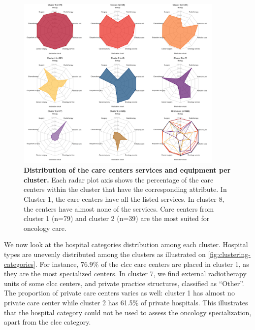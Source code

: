\begin{figure}[H]
    \includegraphics[width=0.9\textwidth]{images/camion/fig1_clusters_services.png}
    \centering
    \caption{ \textbf{Distribution of the care centers services and equipment
            per cluster.} Each radar plot axis shows the percentage of the care
        centers within the cluster that have the corresponding attribute. In
        Cluster 1, the care centers have all the listed services. In cluster 8,
        the centers have almost none of the services. Care centers from cluster
        1 (n=79) and cluster 2 (n=39) are the most suited for oncology care. }
    \label{fig:clustering-spider}
\end{figure}

We now look at the hospital categories distribution among each cluster. Hospital
types are unevenly distributed among the clusters as illustrated on
\cref{fig:clustering-categories}. For instance, 76.9\% of the \ac{clcc} care
centers are placed in cluster 1, as they are the most specialized centers. In
cluster 7, we find external radiotherapy units of some \ac{clcc} centers, and
private practice structures, classified as ``Other''. The proportion of private
care centers varies as well: cluster 1 has almost no private care center while
cluster 2 has 61.5\% of private hospitals. This illustrates that the hospital
category could not be used to assess the oncology specialization, apart
from the \ac{clcc} category.


